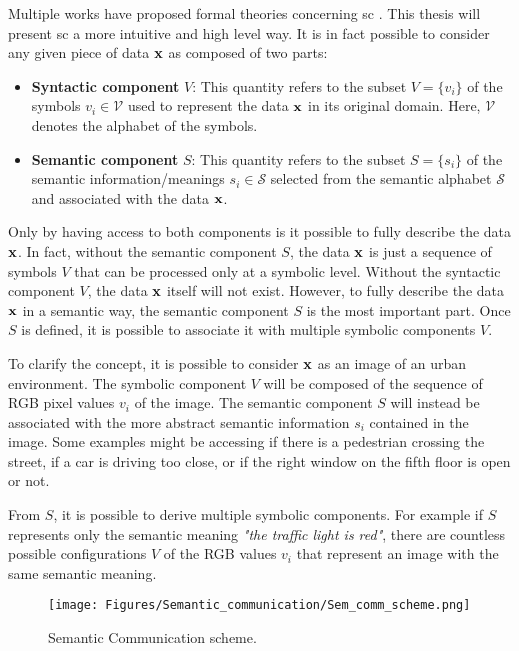 Multiple works have proposed formal theories concerning \gls{sc} \cite{Bao2011SemEntropy, Gunduz2024SemTheory, Carnap1954SemCommTheory}. This thesis will present \gls{sc} a more intuitive and high level way. It is in fact possible to consider any given piece of data $\mathbf{x}$ as composed of two parts: 
\begin{itemize}[{label={}}]
    \item \textbf{Syntactic component} $V$: This quantity refers to the subset $V=\{v_i\}$ of the symbols $v_i \in \mathcal{V}$ used to represent the data $\mathbf{x}$ in its original domain. Here, $\mathcal{V}$ denotes the alphabet of the symbols.
    \item \textbf{Semantic component} $S$: This quantity refers to the subset $S=\{s_i\}$ of the semantic information/meanings $s_i \in \mathcal{S}$ selected from the semantic alphabet $\mathcal{S}$ and associated with the data $\mathbf{x}$. 
\end{itemize}
Only by having access to both components is it possible to fully describe the data $\mathbf{x}$. In fact, without the semantic component $S$, the data $\mathbf{x}$ is just a sequence of symbols $V$ that can be processed only at a symbolic level. Without the syntactic component $V$, the data $\mathbf{x}$ itself will not exist. However, to fully describe the data $\mathbf{x}$ in a semantic way, the semantic component $S$ is the most important part. Once $S$ is defined, it is possible to associate it with multiple symbolic components $V$.

To clarify the concept, it is possible to consider $\mathbf{x}$ as an image of an urban environment. The symbolic component $V$ will be composed of the sequence of RGB pixel values $v_i$ of the image. The semantic component $S$ will instead be associated with the more abstract semantic information $s_i$ contained in the image. Some examples might be accessing if there is a pedestrian crossing the street, if a car is driving too close, or if the right window on the fifth floor is open or not.

From $S$, it is possible to derive multiple symbolic components. For example if $S$ represents only the semantic meaning \textit{"the traffic light is red"}, there are countless possible configurations $V$ of the RGB values $v_i$ that represent an image with the same semantic meaning.

\begin{figure}
    \centering
    \texttt{[image: Figures/Semantic\_communication/Sem\_comm\_scheme.png]}
    \caption[Semantic Communication Scheme]{Semantic Communication scheme.}
    \label{fig: SEMCOM semantic_comm_scheme}
\end{figure}

